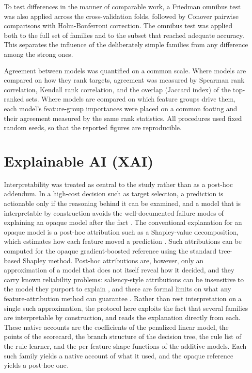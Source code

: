 \documentclass[11pt,twocolumn]{article}
\begin{document}
To test differences in the manner of comparable work, a Friedman omnibus test\cite{ref58} was also applied across the cross-validation folds, followed by Conover pairwise comparisons\cite{ref59} with Holm-Bonferroni correction.\cite{ref60} The omnibus test was applied both to the full set of families and to the subset that reached adequate accuracy. This separates the influence of the deliberately simple families from any difference among the strong ones.

Agreement between models was quantified on a common scale. Where models are compared on how they rank targets, agreement was measured by Spearman rank correlation, Kendall rank correlation, and the overlap (Jaccard index) of the top-ranked sets. Where models are compared on which feature groups drive them, each model's feature-group importances were placed on a common footing and their agreement measured by the same rank statistics. All procedures used fixed random seeds, so that the reported figures are reproducible.

\section{Explainable AI (XAI)}

Interpretability was treated as central to the study rather than as a post-hoc addendum. In a high-cost decision such as target selection, a prediction is actionable only if the reasoning behind it can be examined, and a model that is interpretable by construction avoids the well-documented failure modes of explaining an opaque model after the fact \cite{ref35}. The conventional explanation for an opaque model is a post-hoc attribution such as a Shapley-value decomposition, which estimates how each feature moved a prediction \cite{ref61,ref62}. Such attributions can be computed for the opaque gradient-boosted reference using the standard tree-based Shapley method. Post-hoc attributions are, however, only an approximation of a model that does not itself reveal how it decided, and they carry known reliability problems: saliency-style attributions can be insensitive to the model they purport to explain \cite{ref36}, and there are formal limits on what any feature-attribution method can guarantee \cite{ref37}. Rather than rest interpretation on a single such approximation, the protocol here exploits the fact that several families are interpretable by construction, and reads the explanation directly from each. These native accounts are the coefficients of the penalized linear model, the points of the scorecard, the branch structure of the decision tree, the rule list of the rule learner, and the per-feature shape functions of the additive models. Each such family yields a native account of what it used, and the opaque reference yields a post-hoc one.
\end{document}
